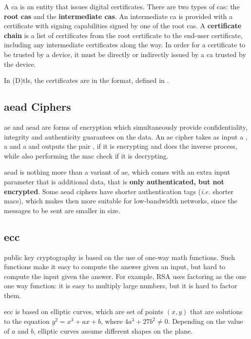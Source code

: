 \documentclass{llncs}
\begin{document}
A \gls{ca} is an entity that issues digital certificates. There are two types of
\gls{ca}s: the \textbf{root \gls{ca}s} and the \textbf{intermediate \gls{ca}s}.
An intermediate \gls{ca} is provided with a certificate with signing capabilities
signed by one of the root \gls{ca}s. A \textbf{certificate chain} is a list of
certificates from the root certificate to the end-user certificate, including
any intermediate certificates along the way. In order for a certificate
to be trusted by a device, it must be directly or indirectly issued by a \gls{ca} trusted by the device.

In (D)\gls{tls}, the certificates are in the  format, defined
in \cite{rfc5280}.

\subsection{\gls{aead} Ciphers} \label{aeadciphers}

\gls{ae} and \gls{aead} are forms of encryption which simultaneously provide
confidentiality, integrity and authenticity guarantees on the data. An \gls{ae}
cipher takes as input a , a  and a 
and outputs the pair , if it is encrypting and does the inverse
process, while also performing the \gls{mac} check if it is decrypting.

\gls{aead} is nothing more than a variant of \gls{ae}, which comes with an extra
input parameter that is additional data, that is \textbf{only authenticated, but not encrypted}.
Some \gls{aead} ciphers have shorter authentication tags (\textit{i.e.} shorter \gls{mac}s),
which makes then more suitable for low-bandwidth networks, since the messages to be sent are smaller in size.

\subsection{\gls{ecc}} \label{eccsection}

public key cryptography is based on the use of one-way math functions. Such
functions make it easy to compute the answer given an input,
but hard to compute the input given the answer. For example, RSA uses factoring
as the one one way function: it is easy to multiply large numbers, but it is hard
to factor them.

\gls{ecc} is based on elliptic curves, which are set of points $(x,y)$ that are
solutions to the equation $y^2 = x^3 + ax + b$, where $4a^3 + 27b^2 \neq 0$.
Depending on the value of $a$ and $b$, elliptic curves assume different shapes
on the plane.
\end{document}
